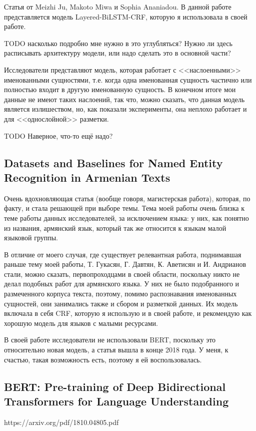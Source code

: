 Статья от Meizhi Ju, Makoto Miwa и Sophia Ananiadou. В данной работе представляется модель Layered-BiLSTM-CRF, которую я использовала в своей работе.

TODO насколько подробно мне нужно в это углубляться? Нужно ли здесь расписывать архитектуру модели, или надо сделать это в основной части?

Исследователи представляют модель, которая работает с <<наслоенными>> именованными сущностями, т.е. когда одна именованная сущность частично или полностью входит в другую именованную сущность. В конечном итоге мои данные не имеют таких наслоений, так что, можно сказать, что данная модель является излишеством, но, как показали эксперименты, она неплохо работает и для <<однослойной>> разметки.

TODO Наверное, что-то ещё надо?

\subsection{Datasets and Baselines for Named Entity Recognition in Armenian Texts}

Очень вдохновляющая статья (вообще говоря, магистерская работа), которая, по факту, и стала решающей при выборе темы. Тема моей работы очень близка к теме работы данных исследователей, за исключением языка: у них, как понятно из названия, армянский язык, который так же относится к языкам малой языковой группы.

В отличие от моего случая, где существует релевантная работа, поднимавшая раньше тему моей работы, Т. Гукасян, Г. Давтян, К. Аветисян и И. Андрианов стали, можно сказать, первопроходцами в своей области, поскольку никто не делал подобных работ для армянского языка. У них не было подобранного и размеченного корпуса текста, поэтому, помимо распознавания именованных сущностей, они занимались также и сбором и разметкой данных. Их модель включала в себя CRF, которую я использую и в своей работе, и рекомендую как хорошую модель для языков с малыми ресурсами.

В своей работе исследователи не использовали BERT, поскольку это относительно новая модель, а статья вышла в конце 2018 года. У меня, к счастью, такая возможность есть, поэтому я ей воспользовалась.

\subsection{BERT: Pre-training of Deep Bidirectional Transformers for
Language Understanding}
https://arxiv.org/pdf/1810.04805.pdf

